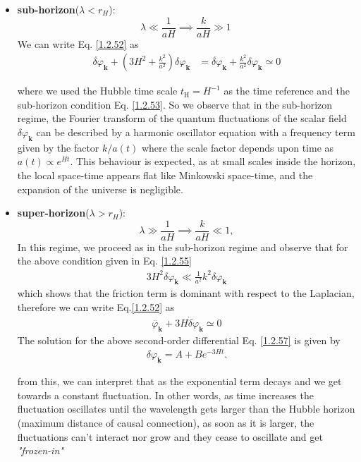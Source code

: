 \begin{itemize}
    \item  \textbf{sub-horizon}($\lambda < r_H$):\\
    \begin{equation}
        \lambda \ll \frac{1}{aH} \implies \frac{k}{aH} \gg 1\ \label{1.2.53}
    \end{equation}
    We can write Eq. \eqref{1.2.52} as
    \begin{align}
        \ddot{ \delta \varphi} _{\mathbf{k}} + (3 H^2  + \frac{k^2}{a^2}) \delta \varphi _{\mathbf{k}} &=  \ddot{ \delta \varphi} _{\mathbf{k}} + \frac{k^2}{a^2} \delta \varphi _{\mathbf{k}} \simeq 0 \label{1.2.54}
    \end{align}  
    
    where we used the Hubble time scale \(t_{\mathrm{H}}=H^{-1}\) as the time reference and the sub-horizon condition Eq. \eqref{1.2.53}. So we observe that in the sub-horizon regime, the Fourier transform of the quantum fluctuations of the scalar field $\delta \varphi_{\mathbf{k}}$ can be described by a harmonic oscillator equation with a frequency term given by the factor $k / a(t)$ where the scale factor depends upon time as  \(a(t) \propto e^{Ht}\). This behaviour is expected, as at small scales inside the horizon, the local space-time appears flat like Minkowski space-time, and the expansion of the universe is negligible.
    
     \item  \textbf{super-horizon}($\lambda > r_H$):\\
    \begin{equation}
        \lambda \gg \frac{1}{aH} \implies \frac{k}{aH} \ll 1, \label{1.2.55}
    \end{equation}
    In this regime, we proceed as in the sub-horizon regime and observe that for the above condition given in Eq. \eqref{1.2.55}
    \begin{align}
       3 H^{2} \delta \varphi_{\mathbf{k}} \ll \frac{1}{a^{2}} k^{2} \delta \varphi_{\mathbf{k}} \label{1.2.56}
    \end{align}
    which shows that the friction term is dominant with respect to the Laplacian, therefore we can write Eq.\eqref{1.2.52} as
    \begin{align}
        \ddot{ \varphi_{\mathbf{k}}}+3 H \dot{\delta} \varphi_{\mathbf{k}} \simeq 0 \label{1.2.57}
    \end{align}    
    The solution for the above second-order differential Eq. \eqref{1.2.57} is given by
   \begin{align}
        \delta \varphi_{\mathbf{k}}=A+B e^{-3 H t} .
    \end{align}
    
    from this, we can interpret that as the exponential term decays and we get towards a constant fluctuation. In other words, as time increases the fluctuation oscillates until the wavelength gets larger than the Hubble horizon
    (maximum distance of causal connection), as soon as it is larger, the fluctuations can't interact nor grow and they cease to oscillate and get \emph{"frozen-in"}
\end{itemize}


